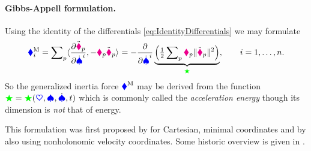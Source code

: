 \paragraph{Gibbs-Appell formulation.}
Using the identity of the differentials \eqref{eq:IdentityDifferentials} we may formulate
\begin{align}
 \genForceInertiaCoeff{\LidxI}
 = \sumParticles \sProd{\pdiff[\particlePosdd{\PidxI}]{\sysVelCoeffd{\LidxI}}}{-\particleMass{\PidxI} \particlePosdd{\PidxI}}
 = -\pdiff{\sysVelCoeffd{\LidxI}} \underbrace{\Big(\tfrac{1}{2} \sumParticles \particleMass{\PidxI} \norm{\particlePosdd{\PidxI}}^2\Big)}_{\accEnergy},
 \qquad
 \LidxI = 1,\ldots,\dimConfigSpace.
\label{eq:InertiaForceAccEnergy}
\end{align}
So the generalized inertia force $\boldsymbol{\textcolor{blue}{\blacklozenge}}^{\mathrm{M}}$ may be derived from the function $\textcolor{green}{\bigstar} = \textcolor{green}{\bigstar}(\boldsymbol{\textcolor{blue}{\heartsuit}}, \boldsymbol{\textcolor{blue}{\spadesuit}}, \dot{\boldsymbol{\textcolor{blue}{\spadesuit}}}, t)$ which is commonly called the \textit{acceleration energy} though its dimension is \textit{not} that of energy.

This formulation was first proposed by \cite{Gibbs:FundamentalFormulaeOfDynamics} for Cartesian, minimal coordinates and by \cite{Appell:formeGenerale} also using nonholonomic velocity coordinates.
Some historic overview is given in \cite[sec. 1]{Lewis:GaussPrinciple}.


